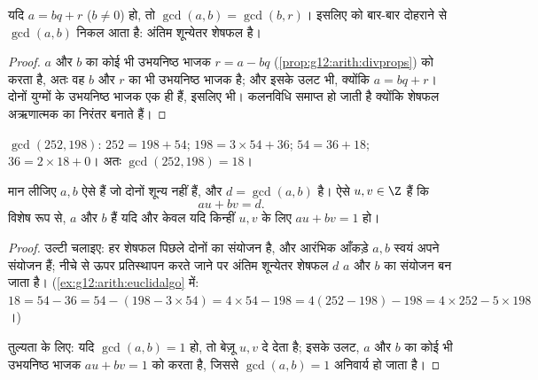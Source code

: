 \begin{proposition}[यूक्लिड की कलनविधि]\label{prop:g12:arith:euclidalgo}
यदि $a = bq + r$ ($b \neq 0$) हो, तो $\gcd(a, b) = \gcd(b, r)$। इसलिए  को बार-बार दोहराने से $\gcd(a,b)$
निकल आता है:  अंतिम शून्येतर शेषफल है।
\end{proposition}

\begin{proof}
$a$ और $b$ का कोई भी उभयनिष्ठ भाजक $r = a - bq$ (\cref{prop:g12:arith:divprops}) को  करता है, अतः वह
$b$ और $r$ का भी उभयनिष्ठ भाजक है; और इसके उलट भी, क्योंकि $a = bq + r$। दोनों
युग्मों के उभयनिष्ठ भाजक एक ही हैं, इसलिए  भी। कलनविधि समाप्त
हो जाती है क्योंकि शेषफल अऋणात्मक  का निरंतर   बनाते
हैं।
\end{proof}

\begin{example}\label{ex:g12:arith:euclidalgo}
$\gcd(252, 198)$: $252 = 198 + 54$; $198 = 3\times54 + 36$; $54 = 36 + 18$; $36 = 2 \times 18 + 0$। अतः $\gcd(252,198) = 18$।
\end{example}

\begin{theorem}[बेज़ू सर्वसमिका]\label{thm:g12:arith:bezout}
मान लीजिए $a, b$ ऐसे  हैं जो दोनों शून्य नहीं हैं, और $d = \gcd(a,b)$ है। ऐसे
$u, v \in \Z$ हैं कि
\[
au + bv = d .
\]
विशेष रूप से, $a$ और $b$  हैं यदि और केवल यदि किन्हीं 
$u, v$ के लिए $au + bv = 1$ हो।
\end{theorem}

\begin{proof}
 उल्टी चलाइए: हर शेषफल पिछले दोनों का  संयोजन है,
और आरंभिक आँकड़े $a, b$ स्वयं अपने संयोजन हैं; नीचे से ऊपर प्रतिस्थापन करते
जाने पर अंतिम शून्येतर शेषफल $d$ $a$ और $b$ का  संयोजन बन जाता
है। (\cref{ex:g12:arith:euclidalgo} में: $18 = 54 - 36 = 54 - (198 - 3\times54) = 4\times54 - 198 =
4(252 - 198) - 198 = 4\times252 - 5\times198$।)

तुल्यता के लिए: यदि $\gcd(a,b) = 1$ हो, तो बेज़ू $u, v$ दे देता है; इसके उलट, $a$ और
$b$ का कोई भी उभयनिष्ठ भाजक $au + bv = 1$ को  करता है, जिससे $\gcd(a,b) = 1$ अनिवार्य
हो जाता है।
\end{proof}

